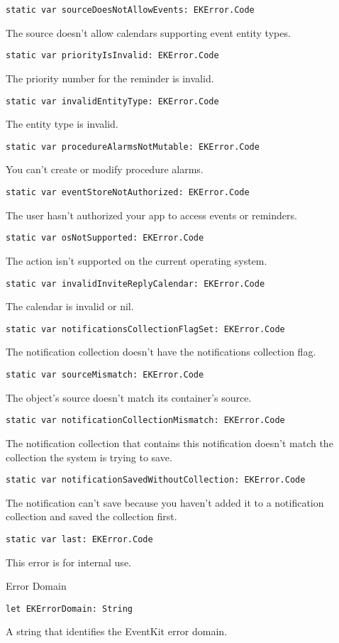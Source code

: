 \documentclass{article}
\begin{document}
\texttt{static var sourceDoesNotAllowEvents: EKError.Code}

The source doesn't allow calendars supporting event entity types.

\texttt{static var priorityIsInvalid: EKError.Code}

The priority number for the reminder is invalid.

\texttt{static var invalidEntityType: EKError.Code}

The entity type is invalid.

\texttt{static var procedureAlarmsNotMutable: EKError.Code}

You can't create or modify procedure alarms.

\texttt{static var eventStoreNotAuthorized: EKError.Code}

The user hasn't authorized your app to access events or reminders.

\texttt{static var osNotSupported: EKError.Code}

The action isn't supported on the current operating system.

\texttt{static var invalidInviteReplyCalendar: EKError.Code}

The calendar is invalid or nil.

\texttt{static var notificationsCollectionFlagSet: EKError.Code}

The notification collection doesn't have the notifications collection flag.

\texttt{static var sourceMismatch: EKError.Code}

The object's source doesn't match its container's source.

\texttt{static var notificationCollectionMismatch: EKError.Code}

The notification collection that contains this notification doesn't match the collection the system is trying to save.

\texttt{static var notificationSavedWithoutCollection: EKError.Code}

The notification can't save because you haven't added it to a notification collection and saved the collection first.

\texttt{static var last: EKError.Code}

This error is for internal use.

Error Domain

\texttt{let EKErrorDomain: String}

A string that identifies the EventKit error domain.
\end{document}
